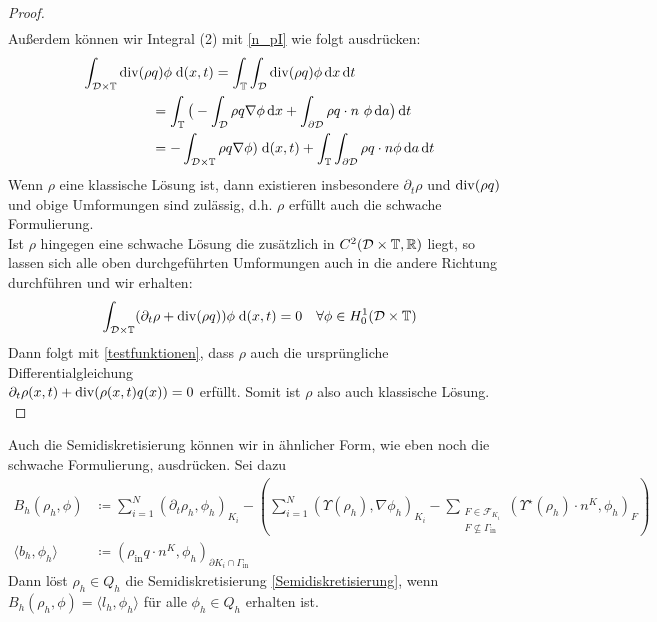 \begin{proof}
\begin{align*}
	\end{align*}
	Außerdem können wir Integral (2) mit  \ref{n_pI} wie folgt ausdrücken:
	\begin{align*}
	\int_{\mathcal{D} \times \mathbb{T}}  
	\operatorname{div}(\rho &q ) \phi\; \mathrm{d} (x,t) = \int_{\mathbb{T}} \int_{\mathcal{D}} \operatorname{div}(\rho q ) \phi \, \mathrm{d} x \, \mathrm{d} t \\
	&= \int_{\mathbb{T}} \big( - \int_{\mathcal{D}} \rho q \nabla \phi \, \mathrm{d} x + \int_{\partial \mathcal{D}} \rho q \cdot n \ \phi \, \mathrm{d} a \big)  \, \mathrm{d} t \\
	&= - \int_{\mathcal{D} \times \mathbb{T}} \rho q \nabla \phi) \; \mathrm{d} (x,t) + \int_{\mathbb{T}} \int_{\partial \mathcal{D}} \rho q \cdot n \phi \, \mathrm{d} a \, \mathrm{d} t 
	\end{align*}
	Wenn $ \rho  $ eine klassische Lösung ist, dann existieren insbesondere $ \partial_t \rho  $ und $ \operatorname{div}(\rho q) $ und obige Umformungen sind zulässig, d.h. $ \rho $ erfüllt auch die schwache Formulierung. \\
	Ist $ \rho $ hingegen eine schwache Lösung die zusätzlich in $ C^2(\mathcal{D}\times\mathbb{T},\mathbb{R}) $ liegt, so lassen sich alle oben durchgeführten Umformungen auch in die andere Richtung durchführen und wir erhalten: 
	\[
	\int_{\mathcal{D}\times\mathbb{T}} (\partial_t\rho + \operatorname{div}(\rho q))\phi \; \mathrm{d} (x,t) = 0 \quad \forall \phi \in H_0^1(\mathcal{D}\times\mathbb{T}) 
	\] 
	Dann folgt mit \eqref{testfunktionen}, dass $ \rho $ auch die ursprüngliche Differentialgleichung\\
	$ \partial_t \rho(x,t) + \operatorname{div}(\rho(x,t) q(x)) = 0  $ erfüllt. Somit ist $ \rho $ also auch klassische Lösung.\\
	
\end{proof}

Auch die Semidiskretisierung können wir in ähnlicher Form, wie eben noch die schwache Formulierung, ausdrücken. Sei dazu
\begin{align*}
B_h(\rho_h,\phi) &\coloneqq \sum_{i=1}^{N} (\partial_t\rho_{h},\phi_h)_{K_i}  - \left( \sum_{i=1}^{N} (\Upsilon(\rho_h),\nabla \phi_h)_{K_i} - \sum_{\substack{F \in \mathcal{F}_{K_i} \\ F \not\subseteq \Gamma_{\text{in}}}} (\Upsilon^{\star}(\rho_h)\cdot n^K,\phi_h)_F\right) \\
\langle b_h , \phi_h \rangle &\coloneqq (\rho_{\text{in}}q \cdot n^K,\phi_h)_{\partial K_i \cap \Gamma_{\text{in}}}
\end{align*}
Dann löst $ \rho_h \in Q_h $ die Semidiskretisierung \eqref{Semidiskretisierung}, wenn $ B_h(\rho_{h},\phi) = \langle l_h,\phi_h \rangle  $ für alle $ \phi_h \in Q_h$ erhalten ist.



